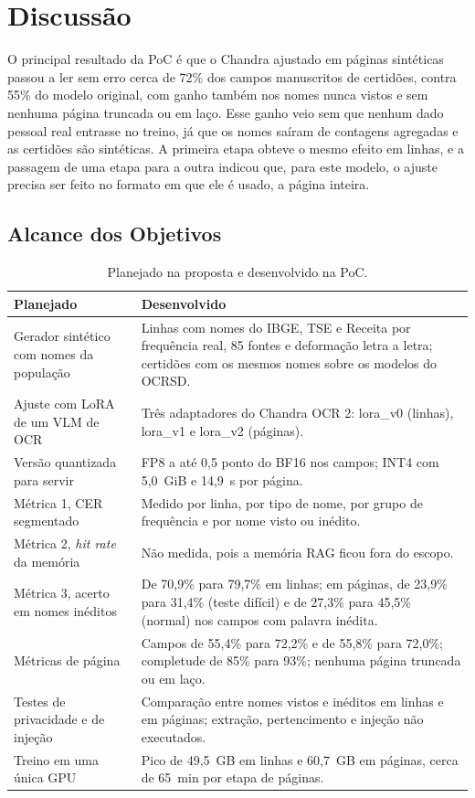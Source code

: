 \documentclass[12pt,a4paper]{article}
\begin{document}
\section{Discussão}
\label{sec:discussao}

O principal resultado da PoC é que o Chandra ajustado em páginas sintéticas passou a ler sem erro cerca de 72\% dos campos manuscritos de certidões, contra 55\% do modelo original, com ganho também nos nomes nunca vistos e sem nenhuma página truncada ou em laço. Esse ganho veio sem que nenhum dado pessoal real entrasse no treino, já que os nomes saíram de contagens agregadas e as certidões são sintéticas. A primeira etapa obteve o mesmo efeito em linhas, e a passagem de uma etapa para a outra indicou que, para este modelo, o ajuste precisa ser feito no formato em que ele é usado, a página inteira.

\subsection{Alcance dos Objetivos}

\begin{table}[H]
\centering
\small
\begin{tabular}{@{}p{5.2cm}p{9.6cm}@{}}
\toprule
Planejado & Desenvolvido \\
\midrule
Gerador sintético com nomes da população & Linhas com nomes do IBGE, TSE e Receita por frequência real, 85 fontes e deformação letra a letra; certidões com os mesmos nomes sobre os modelos do OCRSD. \\
Ajuste com LoRA de um VLM de OCR & Três adaptadores do Chandra OCR 2: lora\_v0 (linhas), lora\_v1 e lora\_v2 (páginas). \\
Versão quantizada para servir & FP8 a até 0,5 ponto do BF16 nos campos; INT4 com 5,0~GiB e 14,9~s por página. \\
Métrica 1, CER segmentado & Medido por linha, por tipo de nome, por grupo de frequência e por nome visto ou inédito. \\
Métrica 2, \emph{hit rate} da memória & Não medida, pois a memória RAG ficou fora do escopo. \\
Métrica 3, acerto em nomes inéditos & De 70,9\% para 79,7\% em linhas; em páginas, de 23,9\% para 31,4\% (teste difícil) e de 27,3\% para 45,5\% (normal) nos campos com palavra inédita. \\
Métricas de página & Campos de 55,4\% para 72,2\% e de 55,8\% para 72,0\%; completude de 85\% para 93\%; nenhuma página truncada ou em laço. \\
Testes de privacidade e de injeção & Comparação entre nomes vistos e inéditos em linhas e em páginas; extração, pertencimento e injeção não executados. \\
Treino em uma única GPU & Pico de 49,5~GB em linhas e 60,7~GB em páginas, cerca de 65~min por etapa de páginas. \\
\bottomrule
\end{tabular}
\caption{Planejado na proposta e desenvolvido na PoC.}
\label{tab:planejado}
\end{table}
\end{document}
